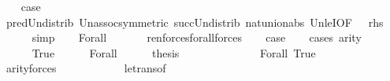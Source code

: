 \begin{isabellebody}
\ \ \isamarkupfalse%
\ {\isacharquery}{\kern0pt}case\isanewline
\ \ \ \ \isamarkupfalse%
\ pred{\isacharunderscore}{\kern0pt}Un{\isacharunderscore}{\kern0pt}distrib\ Un{\isacharunderscore}{\kern0pt}assoc{\isacharbrackleft}{\kern0pt}symmetric{\isacharbrackright}{\kern0pt}\ succ{\isacharunderscore}{\kern0pt}Un{\isacharunderscore}{\kern0pt}distrib\ nat{\isacharunderscore}{\kern0pt}union{\isacharunderscore}{\kern0pt}abs{}\ Un{\isacharunderscore}{\kern0pt}leI{}{\isacharbrackleft}{\kern0pt}OF\ {\isacartoucheopen}{}\ {\isasymle}\ {\isacharquery}{\kern0pt}rhs{\isacartoucheclose}{\isacharbrackright}{\kern0pt}\isanewline
\ \ \ \ \isamarkupfalse%
\ simp\isanewline
{}\isamarkupfalse%
\isanewline
\ \ \isamarkupfalse%
\ {\isacharparenleft}{\kern0pt}Forall\ {\isasymphi}{\isacharparenright}{\kern0pt}\isanewline
\ \ \isamarkupfalse%
\ {\isacharquery}{\kern0pt}{\isasymphi}{\isacharprime}{\kern0pt}\ {\isacharequal}{\kern0pt}\ {\isachardoublequoteopen}ren{\isacharunderscore}{\kern0pt}forces{\isacharunderscore}{\kern0pt}forall{\isacharparenleft}{\kern0pt}forces{\isacharprime}{\kern0pt}{\isacharparenleft}{\kern0pt}{\isasymphi}{\isacharparenright}{\kern0pt}{\isacharparenright}{\kern0pt}{\isachardoublequoteclose}\isanewline
\ \ \isamarkupfalse%
\ {\isacharquery}{\kern0pt}case\isanewline
\ \ \isamarkupfalse%
\ {\isacharparenleft}{\kern0pt}cases\ {\isachardoublequoteopen}arity{\isacharparenleft}{\kern0pt}{\isasymphi}{\isacharparenright}{\kern0pt}\ {\isacharequal}{\kern0pt}\ {}{\isachardoublequoteclose}{\isacharparenright}{\kern0pt}\isanewline
\ \ \ \ \isamarkupfalse%
\ True\isanewline
\ \ \ \ \isamarkupfalse%
\ Forall\isanewline
\ \ \ \ \isamarkupfalse%
\ {\isacharquery}{\kern0pt}thesis\isanewline
\ \ \ \ \isamarkupfalse%
\ {\isacharminus}{\kern0pt}\isanewline
\ \ \ \ \ \ \isamarkupfalse%
\ Forall\ True\isanewline
\ \ \ \ \ \ \isamarkupfalse%
\ {\isachardoublequoteopen}arity{\isacharparenleft}{\kern0pt}forces{\isacharprime}{\kern0pt}{\isacharparenleft}{\kern0pt}{\isasymphi}{\isacharparenright}{\kern0pt}{\isacharparenright}{\kern0pt}\ {\isasymle}\ {}{\isachardoublequoteclose}\isanewline
\ \ \ \ \ \ \ \ \isamarkupfalse%
\ le{\isacharunderscore}{\kern0pt}trans{\isacharbrackleft}{\kern0pt}of\ {\isacharunderscore}{\kern0pt}\ {}\ {}{\isacharbrackright}{\kern0pt}\ \isamarkupfalse%

\end{isabellebody}
